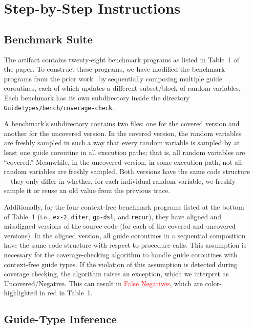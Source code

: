 
\section{Step-by-Step Instructions}

\subsection{Benchmark Suite}

The artifact contains twenty-eight benchmark programs as listed in Table~1 of
the paper.
%
To construct these programs, we have modified the benchmark programs from the
prior work~\citep{PLDI:WHR21B} by sequentially composing multiple guide
coroutines, each of which updates a different subset/block of random variables.
%
Each benchmark has its own subdirectory inside the directory
\texttt{GuideTypes/bench/coverage-check}.

A benchmark's subdirectory contains two files: one for the covered version and
another for the uncovered version.
%
In the covered version, the random variables are freshly sampled in such a way
that every random variable is sampled by at least one guide coroutine in all
execution paths; that is, all random variables are ``covered.''
%
Meanwhile, in the uncovered version, in some execution path, not all random
variables are freshly sampled.
%
Both versions have the same code structure---they only differ in whether, for
each individual random variable, we freshly sample it or reuse an old value from
the previous trace.

Additionally, for the four context-free benchmark programs listed at the bottom
of Table~1 (i.e., \texttt{ex-2}, \texttt{diter}, \texttt{gp-dsl}, and
\texttt{recur}), they have aligned and misaligned versions of the source code
(for each of the covered and uncovered versions).
%
In the aligned version, all guide coroutines in a sequential composition have
the same code structure with respect to procedure calls.
%
This assumption is necessary for the coverage-checking algorithm to handle guide
coroutines with context-free guide types.
%
If the violation of this assumption is detected during coverage checking, the
algorithm raises an exception, which we interpret as Uncovered/Negative.
%
This can result in \textcolor{red}{False Negatives}, which are color-highlighted
in red in Table~1.

\subsection{Guide-Type Inference}

